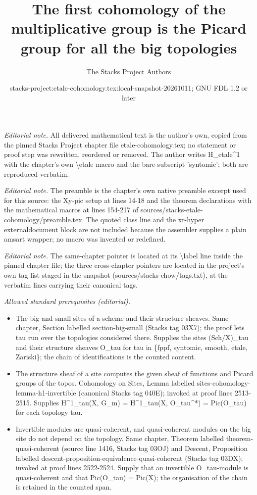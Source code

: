 \documentclass[10pt,a4paper]{amsart}
\title{The first cohomology of the multiplicative group is the Picard group for all the big topologies}
\author{The Stacks Project Authors}
\date{stacks-project:etale-cohomology.tex:local-snapshot-20261011; GNU FDL 1.2 or later}
\theoremstyle{plain}
\theoremstyle{definition}
\theoremstyle{remark}
\numberwithin{equation}{subsection}
\begin{document}
\maketitle
\noindent\textit{Editorial note.} All delivered mathematical text is the author's own, copied from the pinned Stacks Project chapter file etale-cohomology.tex; no statement or proof step was rewritten, reordered or removed. The author writes H\_etale\textasciicircum{}1 with the chapter's own \textbackslash{}etale macro and the bare subscript 'syntomic'; both are reproduced verbatim.\par\medskip
\noindent\textit{Editorial note.} The preamble is the chapter's own native preamble excerpt used for this source: the Xy-pic setup at lines 14-18 and the theorem declarations with the mathematical macros at lines 154-217 of sources/stacks-etale-cohomology/preamble.tex. The quoted class line and the xr-hyper externaldocument block are not included because the assembler supplies a plain amsart wrapper; no macro was invented or redefined.\par\medskip
\noindent\textit{Editorial note.} The same-chapter pointer is located at its \textbackslash{}label line inside the pinned chapter file; the three cross-chapter pointers are located in the project's own tag list staged in the snapshot (sources/stacks-chow/tags.txt), at the verbatim lines carrying their canonical tags.\par\medskip
\noindent\textit{Allowed standard prerequisites (editorial).}\begin{itemize}
\item The big and small sites of a scheme and their structure sheaves. Same chapter, Section labelled section-big-small (Stacks tag 03X7); the proof lets tau run over the topologies considered there. Supplies the sites (Sch/X)\_tau and their structure sheaves O\_tau for tau in \{fppf, syntomic, smooth, etale, Zariski\}; the chain of identifications is the counted content.
\item The structure sheaf of a site computes the given sheaf of functions and Picard groups of the topos. Cohomology on Sites, Lemma labelled sites-cohomology-lemma-h1-invertible (canonical Stacks tag 040E); invoked at proof lines 2513-2515. Supplies H\textasciicircum{}1\_tau(X, G\_m) = H\textasciicircum{}1\_tau(X, O\_tau\textasciicircum{}*) = Pic(O\_tau) for each topology tau.
\item Invertible modules are quasi-coherent, and quasi-coherent modules on the big site do not depend on the topology. Same chapter, Theorem labelled theorem-quasi-coherent (source line 1416, Stacks tag 03OJ) and Descent, Proposition labelled descent-proposition-equivalence-quasi-coherent (Stacks tag 03DX); invoked at proof lines 2522-2524. Supply that an invertible O\_tau-module is quasi-coherent and that Pic(O\_tau) = Pic(X); the organisation of the chain is retained in the counted span.
\end{itemize}\medskip
\end{document}
